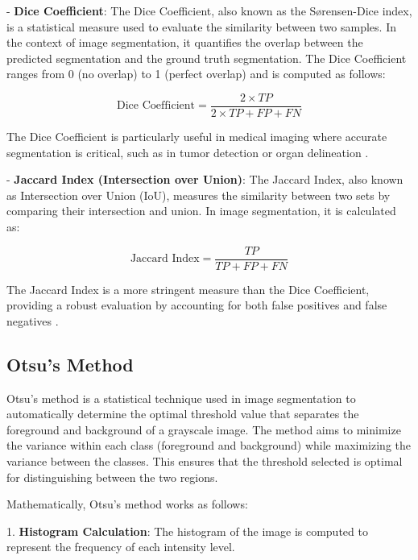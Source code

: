 \documentclass[%
	a4paper, %
	12pt, %
	english, %
	bibtotoc %
]{scrartcl}
\newcommand{\todo}[1]{{\color{blue}{TODO: {#1}}}}
\begin{document}
- \textbf{Dice Coefficient}: The Dice Coefficient, also known as the Sørensen-Dice index, is a statistical measure used to evaluate the similarity between two samples. In the context of image segmentation, it quantifies the overlap between the predicted segmentation and the ground truth segmentation. The Dice Coefficient ranges from 0 (no overlap) to 1 (perfect overlap) and is computed as follows:

  \[
  \text{Dice Coefficient} = \frac{2 \times TP}{2 \times TP + FP + FN}
  \]

  The Dice Coefficient is particularly useful in medical imaging where accurate segmentation is critical, such as in tumor detection or organ delineation \cite{zou2004statistical}.

- \textbf{Jaccard Index (Intersection over Union)}: The Jaccard Index, also known as Intersection over Union (IoU), measures the similarity between two sets by comparing their intersection and union. In image segmentation, it is calculated as:

  \[
  \text{Jaccard Index} = \frac{TP}{TP + FP + FN}
  \]

  The Jaccard Index is a more stringent measure than the Dice Coefficient, providing a robust evaluation by accounting for both false positives and false negatives \cite{real1996probabilistic}.



\subsection{Otsu's Method}

Otsu's method is a statistical technique used in image segmentation to automatically determine the optimal threshold value that separates the foreground and background of a grayscale image. The method aims to minimize the variance within each class (foreground and background) while maximizing the variance between the classes. This ensures that the threshold selected is optimal for distinguishing between the two regions.

Mathematically, Otsu's method works as follows:

1. \textbf{Histogram Calculation}: The histogram of the image is computed to represent the frequency of each intensity level.
\end{document}
